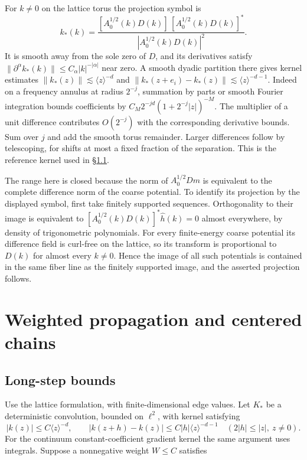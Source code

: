 \documentclass[11pt]{article}
\begin{document}
For \(k\ne0\) on the lattice torus the projection symbol is \[
k_*(k)=
\frac{[A_0^{1/2}(k)D(k)]\,[A_0^{1/2}(k)D(k)]^*}
     {|A_0^{1/2}(k)D(k)|^2}.
\] It is smooth away from the sole zero of \(D\), and its derivatives satisfy \(\|\partial^\alpha k_*(k)\|\le C_\alpha |k|^{-|\alpha|}\) near zero. A smooth dyadic partition there gives kernel estimates \(\|k_*(z)\|\lesssim\langle z\rangle^{-d}\) and \(\|k_*(z+e_i)-k_*(z)\|\lesssim\langle z\rangle^{-d-1}\). Indeed on a frequency annulus at radius \(2^{-j}\), summation by parts or smooth Fourier integration bounds coefficients by \(C_M 2^{-jd}(1+2^{-j}|z|)^{-M}\). The multiplier of a unit difference contributes \(O(2^{-j})\) with the corresponding derivative bounds. Sum over \(j\) and add the smooth torus remainder. Larger differences follow by telescoping, for shifts at most a fixed fraction of the separation. This is the reference kernel used in \S\ref{subsec:weight}.

The range here is closed because the norm of \(A_0^{1/2}Dm\) is equivalent to the complete difference norm of the coarse potential. To identify its projection by the displayed symbol, first take finitely supported sequences. Orthogonality to their image is equivalent to \([A_0^{1/2}(k)D(k)]^*\hat h(k)=0\) almost everywhere, by density of trigonometric polynomials. For every finite-energy coarse potential its difference field is curl-free on the lattice, so its transform is proportional to \(D(k)\) for almost every \(k\neq0\). Hence the image of all such potentials is contained in the same fiber line as the finitely supported image, and the asserted projection follows.

\section{Weighted propagation and centered chains}\label{sec:weight}

\subsection{Long-step bounds}\label{subsec:weight}

Use the lattice formulation, with finite-dimensional edge values. Let \(K_*\) be a deterministic convolution, bounded on \(\ell^2\), with kernel satisfying \[
|k(z)|\le C\langle z\rangle^{-d},\qquad
|k(z+h)-k(z)|\le C |h|\langle z\rangle^{-d-1}\quad (2|h|\le |z|,\ z\ne0).
\] For the continuum constant-coefficient gradient kernel the same argument uses integrals. Suppose a nonnegative weight \(W\le C\) satisfies
\end{document}
